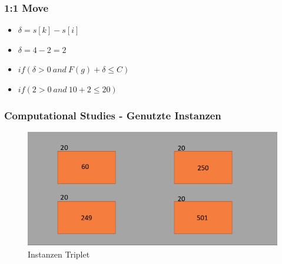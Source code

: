\documentclass{beamer}
\begin{document}
\begin{frame}
\frametitle{1:1 Move}
\begin{footnotesize}
\begin{itemize}
\item $\delta = s[k]-s[i]$
\item $\delta = 4 - 2 = 2$
\item $if(\delta > 0 \ and \ F(g)+\delta \leq C)$
\item $if(2 > 0 \ and \ 10+2 \leq 20)$
\end{itemize}
\end{footnotesize}
\end{frame}
%
\begin{frame}
\frametitle{Computational Studies - Genutzte Instanzen}
\begin{figure}[!htbp]
\begin{center}
\includegraphics[scale=0.25]{img/instance.png}
\end{center}
\caption{Instanzen Triplet}
\label{fig:architecture}
\end{figure}
\end{frame}
\end{document}
